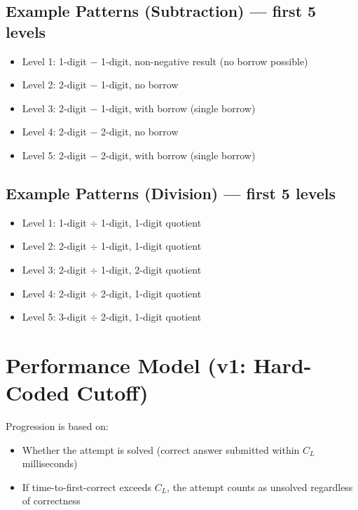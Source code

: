 \documentclass[11pt]{article}
\begin{document}
\subsection*{Example Patterns (Subtraction) --- first 5 levels}

\begin{itemize}[leftmargin=*]
    \item Level 1: 1-digit $-$ 1-digit, non-negative result (no borrow possible)
    \item Level 2: 2-digit $-$ 1-digit, no borrow
    \item Level 3: 2-digit $-$ 1-digit, with borrow (single borrow)
    \item Level 4: 2-digit $-$ 2-digit, no borrow
    \item Level 5: 2-digit $-$ 2-digit, with borrow (single borrow)
\end{itemize}


\subsection*{Example Patterns (Division) --- first 5 levels }

\begin{itemize}[leftmargin=*]
    \item Level 1: 1-digit $\div$ 1-digit, 1-digit quotient
    \item Level 2: 2-digit $\div$ 1-digit, 1-digit quotient
    \item Level 3: 2-digit $\div$ 1-digit, 2-digit quotient
    \item Level 4: 2-digit $\div$ 2-digit, 1-digit quotient
    \item Level 5: 3-digit $\div$ 2-digit, 1-digit quotient
\end{itemize}



\section{Performance Model (v1: Hard-Coded Cutoff)}

Progression is based on:

\begin{itemize}[leftmargin=*]
    \item Whether the attempt is solved (correct answer submitted within $C_L$ milliseconds)
    \item If time-to-first-correct exceeds $C_L$, the attempt counts as unsolved regardless of correctness
\end{itemize}
\end{document}
